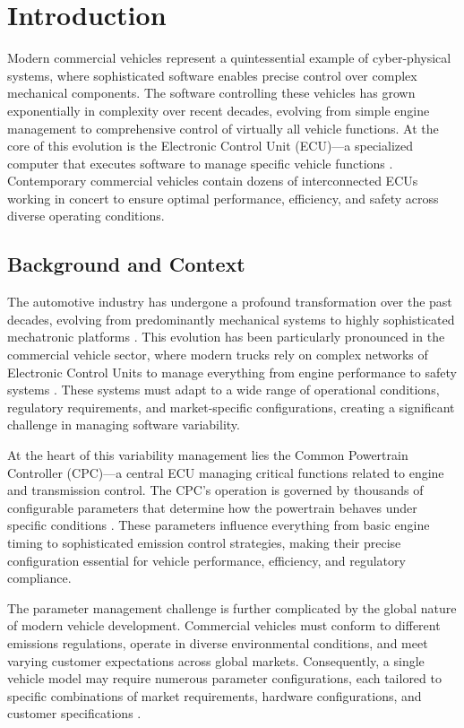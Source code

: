 \chapter{Introduction}
\label{chap:introduction}

Modern commercial vehicles represent a quintessential example of cyber-physical systems, where sophisticated software enables precise control over complex mechanical components. The software controlling these vehicles has grown exponentially in complexity over recent decades, evolving from simple engine management to comprehensive control of virtually all vehicle functions. At the core of this evolution is the Electronic Control Unit (ECU)—a specialized computer that executes software to manage specific vehicle functions \cite{broy2006challenges}. Contemporary commercial vehicles contain dozens of interconnected \acp{ECU} working in concert to ensure optimal performance, efficiency, and safety across diverse operating conditions.

\section{Background and Context}
\label{sec:background}

The automotive industry has undergone a profound transformation over the past decades, evolving from predominantly mechanical systems to highly sophisticated mechatronic platforms \cite{pretschner2007software}. This evolution has been particularly pronounced in the commercial vehicle sector, where modern trucks rely on complex networks of Electronic Control Units to manage everything from engine performance to safety systems \cite{broy2006challenges}. These systems must adapt to a wide range of operational conditions, regulatory requirements, and market-specific configurations, creating a significant challenge in managing software variability.

At the heart of this variability management lies the Common Powertrain Controller (CPC)—a central \ac{ECU} managing critical functions related to engine and transmission control. The CPC's operation is governed by thousands of configurable parameters that determine how the powertrain behaves under specific conditions \cite{staron2021automotive}. These parameters influence everything from basic engine timing to sophisticated emission control strategies, making their precise configuration essential for vehicle performance, efficiency, and regulatory compliance.

The parameter management challenge is further complicated by the global nature of modern vehicle development. Commercial vehicles must conform to different emissions regulations, operate in diverse environmental conditions, and meet varying customer expectations across global markets. Consequently, a single vehicle model may require numerous parameter configurations, each tailored to specific combinations of market requirements, hardware configurations, and customer specifications \cite{trovao2024evolution}.

